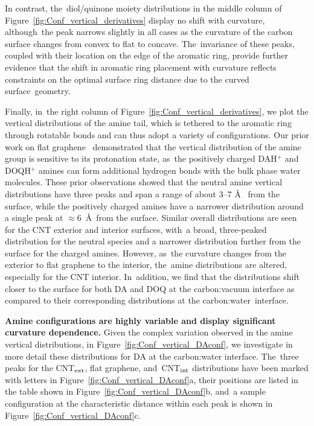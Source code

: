 \documentclass[molecules,article,accept,pdftex,moreauthors]{Definitions/mdpi}
\begin{document}
In contrast, the~diol/quinone moiety distributions in the middle column of Figure~\ref{fig:Conf_vertical_derivatives} display no shift with curvature, although~the peak narrows slightly in all cases as the curvature of the carbon surface changes from convex to flat to concave. The~invariance of these peaks, coupled with their location on the edge of the aromatic ring, provide further evidence that the shift in aromatic ring placement with curvature reflects constraints on the optimal surface ring distance due to the curved surface~geometry.
  
Finally, in~the right column of Figure~\ref{fig:Conf_vertical_derivatives}, we plot the vertical distributions of the amine tail, which is tethered to the aromatic ring through rotatable bonds and can thus adopt a variety of configurations. Our prior work on flat graphene~\cite{Jia2022} demonstrated that the vertical distribution of the amine group is sensitive to its protonation state, as~the positively charged DAH$^+$ and DOQH$^+$ amines can form additional hydrogen bonds with the bulk phase water molecules. These prior observations showed that the neutral amine vertical distributions have three peaks and span a range of about 3--7 \AA~ from the surface, while the positively charged amines have a narrower distribution around a single peak at $\approx$6~\AA\ from the surface. Similar overall distributions are seen for the CNT exterior and interior surfaces, with~a broad, three-peaked distribution for the neutral species and a narrower distribution further from the surface for the charged amines. However, as~the curvature changes from the exterior to flat graphene to the interior, the~amine distributions are altered, especially for the CNT interior. In~addition, we find that the distributions shift closer to the surface for both DA and DOQ at the carbon:vacuum interface as compared to their corresponding distributions at the carbon:water~interface. 



{\bf Amine configurations are highly variable and display significant curvature dependence.}  %
Given the complex variation observed in the amine vertical distributions, in \linebreak Figure~\ref{fig:Conf_vertical_DAconf}, we investigate in more detail these distributions for DA at the carbon:water interface. The~three peaks for the CNT$_{\rm ext}$, flat graphene, and~CNT$_{\rm int}$ distributions have been marked with letters in Figure~\ref{fig:Conf_vertical_DAconf}a, their positions are listed in the table shown in Figure~\ref{fig:Conf_vertical_DAconf}b, and~a sample configuration at the characteristic distance within each peak is shown in Figure~\ref{fig:Conf_vertical_DAconf}c. 
\end{document}
